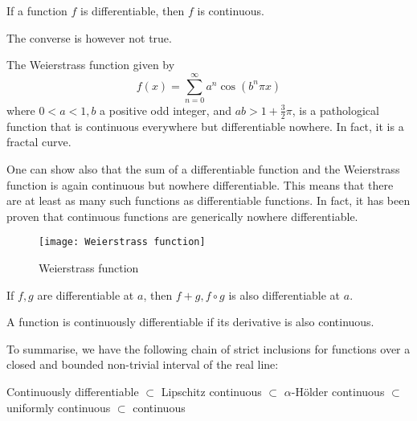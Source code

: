 \documentclass[11pt]{article}
\begin{document}
\begin{theorem}
  If a function \(f\) is differentiable, then \(f\) is continuous.
\end{theorem}
The converse is however not true.

\begin{example}
  The Weierstrass function given by
  \[f(x)=\sum_{n=0}^{\infty}a^n\cos(b^n\pi x)\]
  where \(0<a<1, b\) a positive odd integer, and \(ab>1+\frac{3}{2}\pi\), is a pathological function that is continuous everywhere but differentiable nowhere. In fact, it is a fractal curve.

  One can show also that the sum of a differentiable function and the Weierstrass function is again continuous but nowhere differentiable. This means that there are at least as many such functions as differentiable functions. In fact, it has been proven that continuous functions are generically nowhere differentiable.
\end{example}

\begin{figure}[ht]
  \centering
  \texttt{[image: Weierstrass function]}
  \caption{Weierstrass function}
\end{figure}

\begin{theorem}
  If \(f,g\) are differentiable at \(a\), then \(f+g, f\circ g\) is also differentiable at \(a\).
\end{theorem}

\begin{definition}
  A function is continuously differentiable if its derivative is also continuous.
\end{definition}

To summarise, we have the following chain of strict inclusions for functions over a closed and bounded non-trivial interval of the real line:
\begin{center}
  Continuously differentiable \(\subset\) Lipschitz continuous \(\subset\) \(\alpha\)-Hölder continuous \(\subset\) uniformly continuous \(\subset\) continuous
\end{center}


\end{document}
